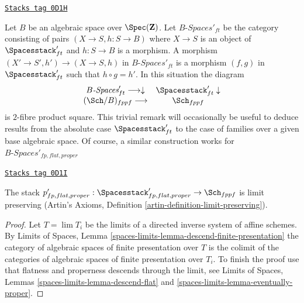 \begin{remark}
\label{quot-remark-spaces-base-change}
\href{https://stacks.math.columbia.edu/tag/0D1H}{\texttt{Stacks tag 0D1H}}

Let $B$ be an algebraic space over $\Spec(\mathbf{Z})$.
Let $B\textit{-Spaces}'_{ft}$ be the category consisting
of pairs $(X \to S, h : S \to B)$
where $X \to S$ is an object of
$\Spacesstack'_{ft}$ and $h : S \to B$ is a morphism.
A morphism $(X' \to S', h') \to (X \to S, h)$
in $B\textit{-Spaces}'_{ft}$ is a morphism $(f, g)$
in $\Spacesstack'_{ft}$ such that $h \circ g = h'$.
In this situation the diagram
$$
\begin{array}{cc}B\textit{-Spaces}'_{ft} \longrightarrow\downarrow & \Spacesstack'_{ft} \downarrow \\ (\Sch/B)_{fppf} \longrightarrow & \Sch_{fppf}\end{array}
$$
is $2$-fibre product square. This trivial remark
will occasionally be useful to deduce results from
the absolute case $\Spacesstack'_{ft}$ to the case
of families over a given base algebraic space.
Of course, a similar construction works for
$B\textit{-Spaces}'_{fp, flat, proper}$
\end{remark}

\begin{lemma}
\label{quot-lemma-spaces-limits}
\href{https://stacks.math.columbia.edu/tag/0D1I}{\texttt{Stacks tag 0D1I}}

The stack
$p'_{fp, flat, proper} :
\Spacesstack'_{fp, flat, proper} \to \Sch_{fppf}$ is limit preserving
(Artin's Axioms, Definition \ref{artin-definition-limit-preserving}).
\end{lemma}

\begin{proof}
Let $T = \lim T_i$ be the limits of a
directed inverse system of affine schemes.
By Limits of Spaces, Lemma
\ref{spaces-limits-lemma-descend-finite-presentation}
the category of algebraic spaces of finite presentation
over $T$ is the colimit of the categories of algebraic spaces
of finite presentation over $T_i$.
To finish the proof use that flatness and properness
descends through the limit, see
Limits of Spaces, Lemmas
\ref{spaces-limits-lemma-descend-flat} and
\ref{spaces-limits-lemma-eventually-proper}.
\end{proof}

